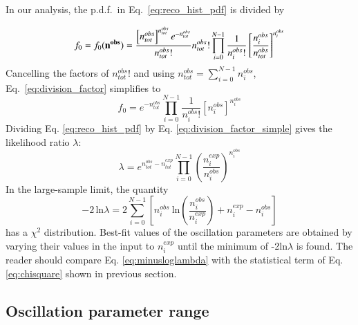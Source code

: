 In our analysis, the p.d.f.\ in Eq.\ \ref{eq:reco_hist_pdf} is divided by

\begin{equation}
\displaystyle
f_{0} = f_{0}({\bf n^{obs}}) = 
  \frac{\left[n^{obs}_{tot}\right]^{n^{obs}_{tot}}e^{-n^{obs}_{tot}}}{n^{obs}_{tot}!} n^{obs}_{tot}! 
       \prod_{i=0}^{N-1} \frac{1}{n^{obs}_{i}!} \left[\frac{n^{obs}_{i}}{n^{obs}_{tot}} \right]^{n^{obs}_{i}}
\label{eq:division_factor}
\end{equation}
Cancelling the factors of $n^{obs}_{tot}!$ and using $n^{obs}_{tot} = \sum_{i=0}^{N-1}n^{obs}_{i}$, Eq.\ \ref{eq:division_factor} simplifies to
\begin{equation}
\displaystyle
f_{0} = 
  e^{-n^{obs}_{tot}}  
  \prod_{i=0}^{N-1} 
  \frac{1}{n^{obs}_{i}!} \left[n^{obs}_{i} \right]^{n^{obs}_{i}}
\label{eq:division_factor_simple}
\end{equation}
Dividing Eq. \ref{eq:reco_hist_pdf} by Eq. \ref{eq:division_factor_simple} gives the likelihood ratio $\lambda$:
\begin{equation}
\displaystyle
\lambda = e^{n^{obs}_{tot}-n^{exp}_{tot}} 
   \prod_{i=0}^{N-1} \left(\frac{n^{exp}_{i}}{n^{obs}_{i}} \right)^{n^{obs}_{i}}
\label{eq:lambda}
\end{equation}
In the large-sample limit, the quantity
\begin{equation}
\displaystyle
-2 \, \textrm{ln} \lambda = 
   2 \sum_{i=0}^{N-1} 
   \left[n^{obs}_{i} \: \textrm{ln} \left(\frac{n^{obs}_{i}}{n^{exp}_{i}} \right) + 
   n^{exp}_{i} - n^{obs}_{i} \right]
\label{eq:minusloglambda}
\end{equation}
has a $\chi^{2}$ distribution. Best-fit values of the oscillation parameters 
are obtained by varying their values in the input to
$n^{exp}_{i}$ until the minimum of -2ln$\lambda$ is found. 
The reader should compare Eq. \ref{eq:minusloglambda} with the statistical
term of Eq. \ref{eq:chisquare} shown in previous section.


\subsection {Oscillation parameter range}
\label{sec:osc_par_limits}

